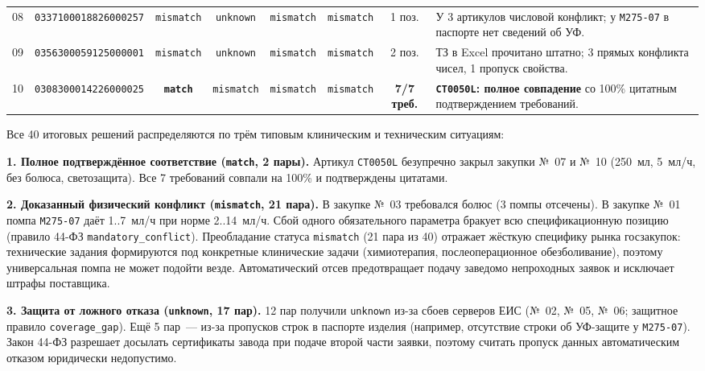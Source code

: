 \documentclass[10pt,a4paper]{article}
\begin{document}
\begin{table}[htbp]
\begin{tabularx}{\textwidth}{p{0.35cm} p{3.6cm} c c c c c Y}
08 & \texttt{0337100018826000257} & \texttt{mismatch} & \texttt{unknown} & \texttt{mismatch} & \texttt{mismatch} & 1 поз. & У 3 артикулов числовой конфликт; у \texttt{M275-07} в паспорте нет сведений об УФ. \\
09 & \texttt{0356300059125000001} & \texttt{mismatch} & \texttt{unknown} & \texttt{mismatch} & \texttt{mismatch} & 2 поз. & ТЗ в Excel прочитано штатно; 3 прямых конфликта чисел, 1 пропуск свойства. \\
10 & \texttt{0308300014226000025} & \textbf{\texttt{match}} & \texttt{mismatch} & \texttt{mismatch} & \texttt{mismatch} & \textbf{7/7 треб.} & \textbf{\texttt{CT0050L}: полное совпадение} со 100\% цитатным подтверждением требований. \\
\bottomrule
\end{tabularx}
\end{table}

Все 40 итоговых решений распределяются по трём типовым клиническим и техническим ситуациям:

\textbf{1. Полное подтверждённое соответствие (\texttt{match}, 2 пары).} Артикул \texttt{CT0050L} безупречно закрыл закупки №~07 и №~10 (250~мл, 5~мл/ч, без болюса, светозащита). Все 7 требований совпали на 100\% и подтверждены цитатами.

\textbf{2. Доказанный физический конфликт (\texttt{mismatch}, 21 пара).} В закупке №~03 требовался болюс (3 помпы отсечены). В закупке №~01 помпа \texttt{M275-07} даёт 1..7~мл/ч при норме 2..14~мл/ч. Сбой одного обязательного параметра бракует всю спецификационную позицию (правило 44-ФЗ \texttt{mandatory\_conflict}). Преобладание статуса \texttt{mismatch} (21 пара из 40) отражает жёсткую специфику рынка госзакупок: технические задания формируются под конкретные клинические задачи (химиотерапия, послеоперационное обезболивание), поэтому универсальная помпа не может подойти везде. Автоматический отсев предотвращает подачу заведомо непроходных заявок и исключает штрафы поставщика.

\textbf{3. Защита от ложного отказа (\texttt{unknown}, 17 пар).} 12 пар получили \texttt{unknown} из-за сбоев серверов ЕИС (№~02, №~05, №~06; защитное правило \texttt{coverage\_gap}). Ещё 5 пар~--- из-за пропусков строк в паспорте изделия (например, отсутствие строки об УФ-защите у \texttt{M275-07}). Закон 44-ФЗ разрешает досылать сертификаты завода при подаче второй части заявки, поэтому считать пропуск данных автоматическим отказом юридически недопустимо.
\end{document}
